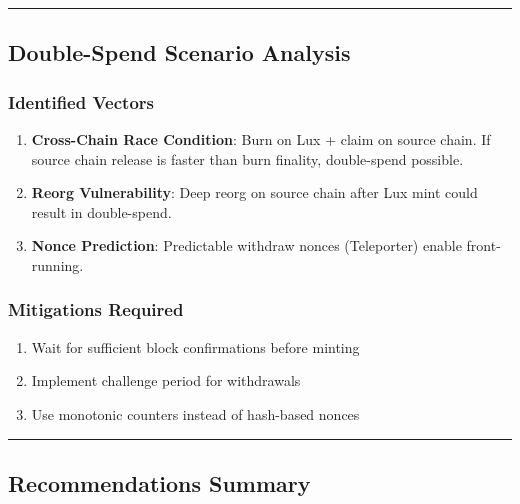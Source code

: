 \documentclass[
]{article}
\providecommand{\tightlist}{%
  \setlength{\itemsep}{0pt}\setlength{\parskip}{0pt}}
\begin{document}
\begin{center}\rule{0.5\linewidth}{0.5pt}\end{center}

\subsection{Double-Spend Scenario
Analysis}\label{double-spend-scenario-analysis}

\subsubsection{Identified Vectors}\label{identified-vectors}

\begin{enumerate}
\def\labelenumi{\arabic{enumi}.}
\item
  \textbf{Cross-Chain Race Condition}: Burn on Lux + claim on source
  chain. If source chain release is faster than burn finality,
  double-spend possible.
\item
  \textbf{Reorg Vulnerability}: Deep reorg on source chain after Lux
  mint could result in double-spend.
\item
  \textbf{Nonce Prediction}: Predictable withdraw nonces (Teleporter)
  enable front-running.
\end{enumerate}

\subsubsection{Mitigations Required}\label{mitigations-required}

\begin{enumerate}
\def\labelenumi{\arabic{enumi}.}
\tightlist
\item
  Wait for sufficient block confirmations before minting
\item
  Implement challenge period for withdrawals
\item
  Use monotonic counters instead of hash-based nonces
\end{enumerate}

\begin{center}\rule{0.5\linewidth}{0.5pt}\end{center}

\subsection{Recommendations Summary}\label{recommendations-summary}
\end{document}

